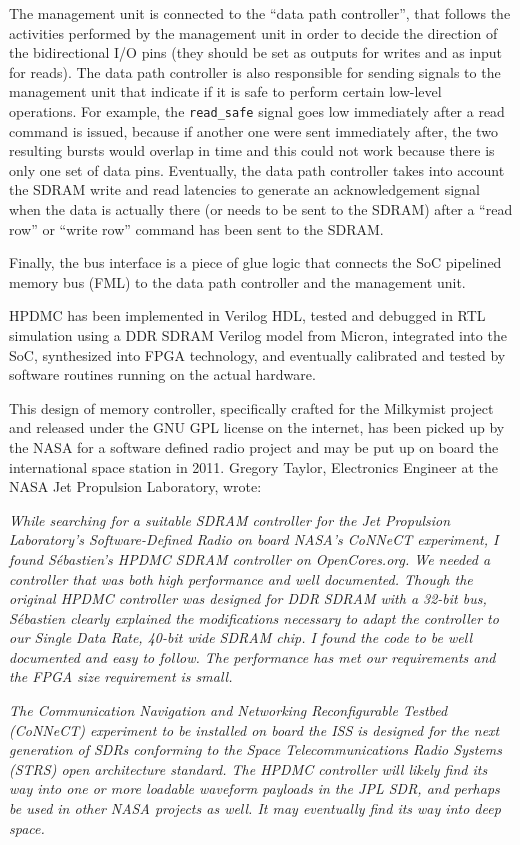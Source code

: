 \documentclass[a4paper,11pt]{kthesis}
\begin{document}
The management unit is connected to the ``data path controller'', that follows the activities performed by the management unit in order to decide the direction of the bidirectional I/O pins (they should be set as outputs for writes and as input for reads). The data path controller is also responsible for sending signals to the management unit that indicate if it is safe to perform certain low-level operations. For example, the \verb!read_safe! signal goes low immediately after a read command is issued, because if another one were sent immediately after, the two resulting bursts would overlap in time and this could not work because there is only one set of data pins. Eventually, the data path controller takes into account the SDRAM write and read latencies to generate an acknowledgement signal when the data is actually there (or needs to be sent to the SDRAM) after a ``read row'' or ``write row'' command has been sent to the SDRAM.

Finally, the bus interface is a piece of glue logic that connects the SoC pipelined memory bus (FML) to the data path controller and the management unit.

HPDMC has been implemented in Verilog HDL, tested and debugged in RTL simulation using a DDR SDRAM Verilog model from Micron, integrated into the SoC, synthesized into FPGA technology, and eventually calibrated and tested by software routines running on the actual hardware.

This design of memory controller, specifically crafted for the Milkymist project and released under the GNU GPL license on the internet, has been picked up by the NASA for a software defined radio project and may be put up on board the international space station in 2011. Gregory Taylor, Electronics Engineer at the NASA Jet Propulsion Laboratory, wrote:

\textit{While searching for a suitable SDRAM controller for the Jet Propulsion Laboratory's Software-Defined Radio on board NASA's CoNNeCT experiment, I found S\'ebastien's HPDMC SDRAM controller on OpenCores.org. We needed a controller that was both high performance and well documented. Though the original HPDMC controller was designed for DDR SDRAM with a 32-bit bus, S\'ebastien clearly explained the modifications necessary to adapt the controller to our Single Data Rate, 40-bit wide SDRAM chip. I found the code to be well documented and easy to follow. The performance has met our requirements and the FPGA size requirement is small.}

\textit{The Communication Navigation and Networking Reconfigurable Testbed (CoNNeCT) experiment to be installed on board the ISS is designed for the next generation of SDRs conforming to the Space Telecommunications Radio Systems (STRS) open architecture standard. The HPDMC controller will likely find its way into one or more loadable waveform payloads in the JPL SDR, and perhaps be used in other NASA projects as well. It may eventually find its way into deep space.}
\end{document}
